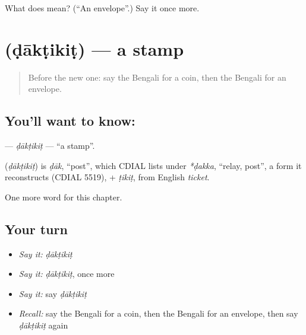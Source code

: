 \begin{tcolorbox}[breakable,colback=teal!4,colframe=teal!35!black,title={Before you move on}]
What does  mean? (\textquotedblleft{}An envelope\textquotedblright{}.) Say it once more.
\end{tcolorbox}
\section[\texorpdfstring{\bn{ডাকটিকিট} (ḍākṭikiṭ)}{ডাকটিকিট (ḍākṭikiṭ)}]{ (ḍākṭikiṭ) — a stamp}

\label{lesson:BN-C130-daktikit}



\begin{quote}
Before the new one: say the Bengali for a coin, then the Bengali for an envelope.
\end{quote}

\subsection*{You'll want to know: }
\textbf{} — \emph{ḍākṭikiṭ} — \textquotedblleft{}a stamp\textquotedblright{}.

\begin{cousinweb}
\textbf{} (\emph{ḍākṭikiṭ}) is \emph{ḍāk}, \textquotedblleft{}post\textquotedblright{}, which CDIAL lists under \emph{*ḍakka}, \textquotedblleft{}relay, post\textquotedblright{}, a form it reconstructs (CDIAL 5519), + \emph{ṭikiṭ}, from English \emph{ticket}.
\end{cousinweb}

\begin{grammarlens}[title={What you've built}]
One more word for this chapter.
\end{grammarlens}

\subsection*{Your turn}
\begin{itemize}
\raggedright
  \item \emph{Say it:} \emph{ḍākṭikiṭ}
  \item \emph{Say it:} \emph{ḍākṭikiṭ}, once more
  \item \emph{Say it:} say \emph{ḍākṭikiṭ}
  \item \emph{Recall:} say the Bengali for a coin, then the Bengali for an envelope, then say \emph{ḍākṭikiṭ} again
\end{itemize}

